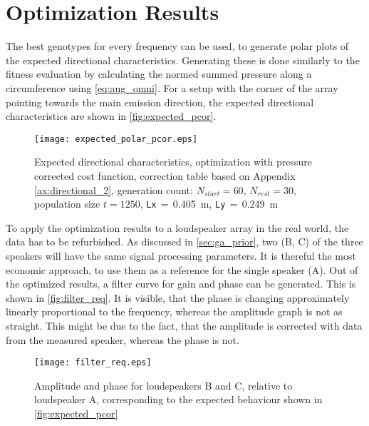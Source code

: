 \section{Optimization Results}\label{sec:opt_result}
The best genotypes for every frequency can be used, to generate polar plots of the expected directional characteristics. Generating these is done similarly to the fitness evaluation by calculating the normed summed pressure along a circumference using \autoref{eq:aug_omni}.
For a setup with the corner of the array pointing towards the main emission direction, the expected directional characteristics are shown in \autoref{fig:expected_pcor}.\\
\begin{figure}[h]
	\centering
	\texttt{[image: expected\_polar\_pcor.eps]}
	\caption{Expected directional characteristics, optimization with pressure corrected cost function, correction table based on Appendix \ref{ax:directional_2}, generation count: $N_{start}=60$, $N_{rest}=30$, population size $t=1250$, \textcolor{green3}{\texttt{Lx}}\,$=$\,\SI{0.405}{\meter}, \textcolor{green3}{\texttt{Ly}}\,$=\,$\SI{0.249}{\meter}}
		\label{fig:expected_pcor}
\end{figure}
To apply the optimization results to a loudspeaker array in the real world, the data has to be refurbished. As discussed in \autoref{sec:ga_prior}, two (B, C) of the three speakers will have the same signal processing parameters. It is thereful the most economic approach, to use them as a reference for the single speaker (A). Out of the optimized results, a filter curve for gain and phase can be generated. This is shown in \autoref{fig:filter_req}. It is visible, that the phase is changing approximately linearly proportional to the frequency, whereas the amplitude graph is not as straight. This might be due to the fact, that the amplitude is corrected with data from the measured speaker, whereas the phase is not.
\begin{figure}[h]
	\centering
	\texttt{[image: filter\_req.eps]}
	\caption{Amplitude and phase for loudspeakers B and C, relative to loudspeaker A, corresponding to the expected behaviour shown in \autoref{fig:expected_pcor}}
		\label{fig:filter_req}
\end{figure}